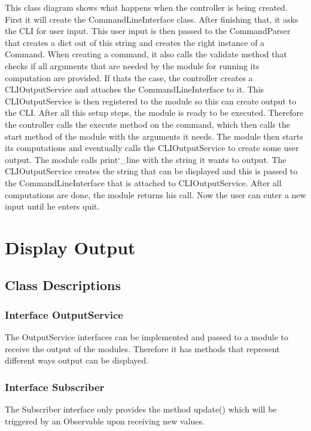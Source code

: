 \documentclass[parskip=full]{scrartcl}
\begin{document}
This class diagram shows what happens when the controller is being created.
First it will create the CommandLineInterface class.
After finishing that, it asks the \gls{CLI} for user input.
This user input is then passed to the CommandParser that creates a dict out of this string and creates the right instance of a Command.
When creating a command, it also calls the validate method that checks if all arguments that are needed by the module for running its computation are provided.
If thats the case, the controller creates a CLIOutputService and attaches the CommandLineInterface to it.
This CLIOutputService is then registered to the module so this can create output to the \gls{CLI}.
After all this setup steps, the module is ready to be executed.
Therefore the controller calls the execute method on the command, which then calls the start method of the module with the arguments it needs.
The module then starts its computations and eventually calls the CLIOutputService to create some user output.
The module calls print\char`_line with the string it wants to output.
The CLIOutputService creates the string that can be displayed and this is passed to the CommandLineInterface that is attached to CLIOutputService.
After all computations are done, the module returns his call.
Now the user can enter a new input until he enters quit.

\newpage

\section{Display Output}

\subsection{Class Descriptions}

\subsubsection{Interface OutputService}
The OutputService interfaces can be implemented and passed to a module to receive the output of the modules. 
Therefore it has methods that represent different ways output can be displayed. 

 \subsubsection{Interface Subscriber}
The Subscriber interface only provides the method update() which will be triggered by an Observable upon receiving new values.
\end{document}

